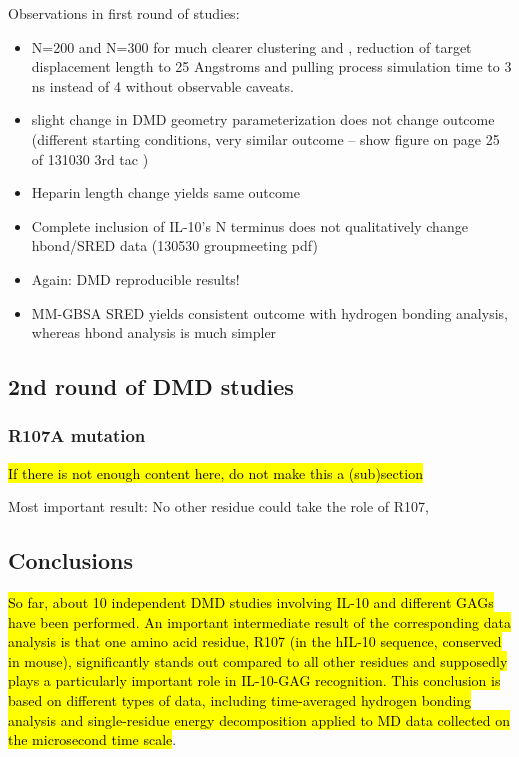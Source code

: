 Observations in first round of studies:

\begin{itemize}

\item N=200 and N=300 for much clearer clustering and , reduction of target displacement length
to 25  Angstroms and pulling process simulation time to 3 ns instead of 4 without
observable caveats.

\item slight change in DMD geometry parameterization does not change outcome (different starting conditions, very similar outcome -- show figure on page 25 of 131030 3rd tac )

\item Heparin length change yields same outcome

\item Complete inclusion of IL-10's N terminus does not qualitatively change hbond/SRED data (130530 groupmeeting pdf)

\item Again: DMD reproducible results!

\item MM-GBSA SRED yields consistent outcome with hydrogen bonding analysis,
whereas hbond analysis is much simpler

\end{itemize}



\subsection{2nd round of DMD studies}

\subsubsection{R107A mutation}

\hl{If there is not enough content here, do not make this a (sub)section}

Most important result: No other residue could take the role of R107,

\subsection{Conclusions}

\hl{So far, about 10 independent DMD studies involving IL-10 and different GAGs
have been performed. An important intermediate result of the corresponding data
analysis is that one amino acid residue, R107 (in the hIL-10 sequence, conserved
in mouse), significantly stands out compared to all other residues and
supposedly plays a particularly important role in IL-10-GAG recognition. This
conclusion is based on different types of data, including time-averaged hydrogen
bonding analysis and single-residue energy decomposition applied to MD data
collected on the microsecond time scale}.

